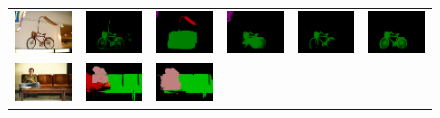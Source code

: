 \begin{figure}[!htbp]
{\begin{tabular}{c c c c c c}
    \includegraphics[height=0.123\linewidth]{fig/val_crf_vis/img/2008_004363.jpg} &
    \includegraphics[height=0.123\linewidth]{fig/val_crf_vis/adaweak/2008_004363.png} &
    \includegraphics[height=0.123\linewidth]{fig/val_crf_vis/bbox/2008_004363.png} &
    \includegraphics[height=0.123\linewidth]{fig/val_crf_vis/bbox_crf/2008_004363.png} &
    \includegraphics[height=0.123\linewidth]{fig/val_crf_vis/strongweak/2008_004363.png} &
    \includegraphics[height=0.123\linewidth]{fig/val_crf_vis/cocomix/2008_004363.png} \\
    \includegraphics[height=0.11\linewidth]{fig/val_crf_vis/img/2009_001299.jpg} &
    \includegraphics[height=0.11\linewidth]{fig/val_crf_vis/adaweak/2009_001299.png} &
    \includegraphics[height=0.11\linewidth]{fig/val_crf_vis/bbox/2009_001299.png} &

\end{tabular}}
\end{figure}
